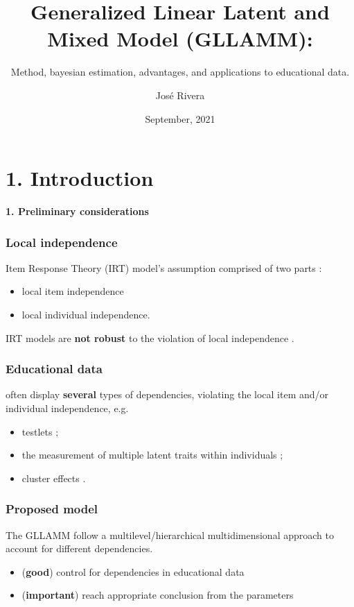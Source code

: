 \documentclass[nonav,sleutel]{beamer}
\title{\textbf{Generalized Linear Latent and Mixed Model (GLLAMM): }}
\subtitle{Method, bayesian estimation, advantages, and applications to educational data.}
\author{{Jos\'e Rivera}}
\institute{%
	\textbf{\small{Master of Science in Statistics and Data Science}}
	\and
	\textbf{\small{KU Leuven}}}
\date{September, 2021}
\begin{document}
	\frame{\titlepage}
	\section{1. Introduction}
	\begin{frame}
		\LARGE{\textbf{1. Preliminary considerations}}
	\end{frame}
	\begin{frame}
		\frametitle{Local independence}
		Item Response Theory (IRT) model's assumption comprised of two parts \cite{Baker_2001, Hambleton_et_al_1991a}:
		\begin{itemize}
			\item local item independence 
			\item local individual independence.
		\end{itemize}
		\vspace{0.3cm} IRT models are \textbf{not robust} to the violation of local independence \cite{Yen_1984, Chen_et_al_1997, Jiao_et_al_2012}. 
	\end{frame}
	\begin{frame}
		\frametitle{Educational data}
		often display \textbf{several} types of dependencies, violating the local item and/or individual independence, e.g.
		\begin{itemize}
			\item testlets \cite{Wainer_et_al_2007};  
			\item the measurement of multiple latent traits within individuals \cite{Reckase_2009}; 
			\item cluster effects \cite{Raudenbush_et_al_2002}.
		\end{itemize}
	\end{frame}
	\begin{frame}
		\frametitle{Proposed model}
		The GLLAMM follow a multilevel/hierarchical multidimensional approach to account for different dependencies. \\
		\begin{itemize}
			\item (\textbf{good}) control for dependencies in educational data
			\item (\textbf{important}) reach appropriate conclusion from the parameters 
		\end{itemize}
	\end{frame}
\end{document}
